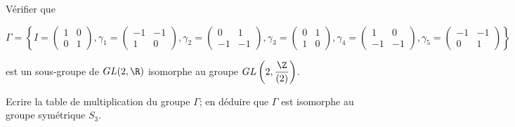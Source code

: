 Vérifier que 

\[
\Gamma = 
\left\{
I = \begin{pmatrix}
    1 & 0 \\
    0 & 1
\end{pmatrix},
\gamma_1 =
\begin{pmatrix}
    -1 & -1 \\
    1 & 0 
\end{pmatrix},
\gamma_2 =
\begin{pmatrix}
    0 & 1 \\
    -1 & -1
\end{pmatrix},
\gamma_3 =
\begin{pmatrix}
    0 & 1 \\
    1 & 0
\end{pmatrix},
\gamma_4 =
\begin{pmatrix}
    1 & 0 \\
    -1 & -1
\end{pmatrix},
\gamma_5 = 
\begin{pmatrix}
    -1 & -1 \\
    0 & 1
\end{pmatrix}
\right\}
\]

est un sous-groupe de $GL(2,\R)$ isomorphe au groupe $GL \left( 2, \dfrac{\Z}{(2)}  \right)$.

Ecrire la table de multiplication du groupe $\Gamma$; en déduire que $\Gamma$ est isomorphe au groupe symétrique $S_3$.